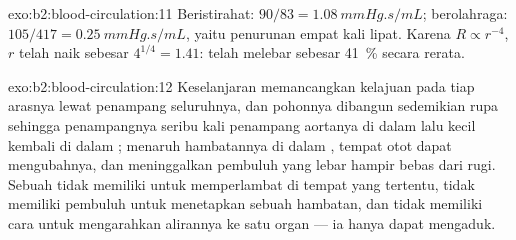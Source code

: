 \begin{solution}{exo:b2:blood-circulation:11}
Beristirahat: $90/83 = \qty{1.08}{mmHg.s/mL}$; berolahraga: $105/417 =
\qty{0.25}{mmHg.s/mL}$, yaitu penurunan empat kali lipat. Karena $R \propto r^{-4}$,
$r$ telah naik sebesar $4^{1/4} = 1.41$:  telah melebar
sebesar \qty{41}{\%} secara rerata.
\end{solution}

\begin{solution}{exo:b2:blood-circulation:12}
Keselanjaran memancangkan kelajuan pada tiap arasnya lewat penampang
seluruhnya, dan pohonnya dibangun sedemikian rupa sehingga penampangnya
seribu kali penampang aortanya di dalam  lalu kecil kembali
di dalam ;  menaruh hambatannya di dalam
, tempat otot dapat mengubahnya, dan meninggalkan pembuluh
yang lebar hampir bebas dari rugi. Sebuah  tidak
memiliki  untuk memperlambat  di tempat yang tertentu,
tidak memiliki pembuluh untuk menetapkan sebuah hambatan, dan tidak
memiliki cara untuk mengarahkan alirannya ke satu organ --- ia hanya
dapat mengaduk.
\end{solution}

